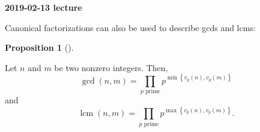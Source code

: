 \documentclass[numbers=enddot,12pt,final,onecolumn,notitlepage]{scrartcl}%
\numberwithin{exer}{subsection}
\theoremstyle{definition}
\newtheorem{prop}[theo]{Proposition}
\newenvironment{proposition}[1][]
{\begin{prop}[#1]\begin{leftbar}}
{\end{leftbar}\end{prop}}
\let\prodnonlimits\prod
\renewcommand{\prod}{\prodnonlimits\limits}
\begin{document}
\begin{center}
\textbf{2019-02-13 lecture}
\end{center}

Canonical factorizations can also be used to describe gcds and lcms:

\begin{proposition}
\label{prop.ent.prime.gcd}Let $n$ and $m$ be two nonzero integers. Then,%
\begin{equation}
\gcd\left(  n,m\right)  =\prod_{p\text{ prime}}p^{\min\left\{  v_{p}\left(
n\right)  ,v_{p}\left(  m\right)  \right\}  }
\label{eq.prop.ent.prime.gcd.gcd}%
\end{equation}
and%
\begin{equation}
\operatorname{lcm}\left(  n,m\right)  =\prod_{p\text{ prime}}p^{\max\left\{
v_{p}\left(  n\right)  ,v_{p}\left(  m\right)  \right\}  }.
\label{eq.prop.ent.prime.gcd.lcm}%
\end{equation}

\end{proposition}
\end{document}
